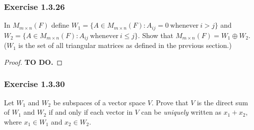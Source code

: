 \subsubsection{Exercise 1.3.26} In \(  M_{m \times n }(F)    \) define  \( W_{1} = \{ A \in M_{m \times n  } (F ) : A_{ij } = 0 \ \text{whenever} \  i > j   \}  \)  and \( W_{2} = \{ A \in M_{m \times n }(F) : A_{ij} \ \text{whenever} \ i \leq j \}  \). Show that \( M_{m \times n } (F) = W_{1} \oplus W_{2} \). (\( W_{1}  \) is the set of all triangular matrices as defined in the previous section.)
\begin{proof}
\textbf{TO DO.}
\end{proof}

\subsubsection{Exercise 1.3.30} Let \( W_{1} \) and \( W_{2}  \) be subspaces of a vector space \( V  \). Prove that \( V  \) is the direct sum of \( W_{1}  \) and \( W_{2}  \) if and only if each vector in \( V  \) can be \textit{uniquely}  written as \( x_{1} + x_{2}  \), where \( x_{1} \in W_{1}  \) and \( x_{2} \in W_{2} \).
